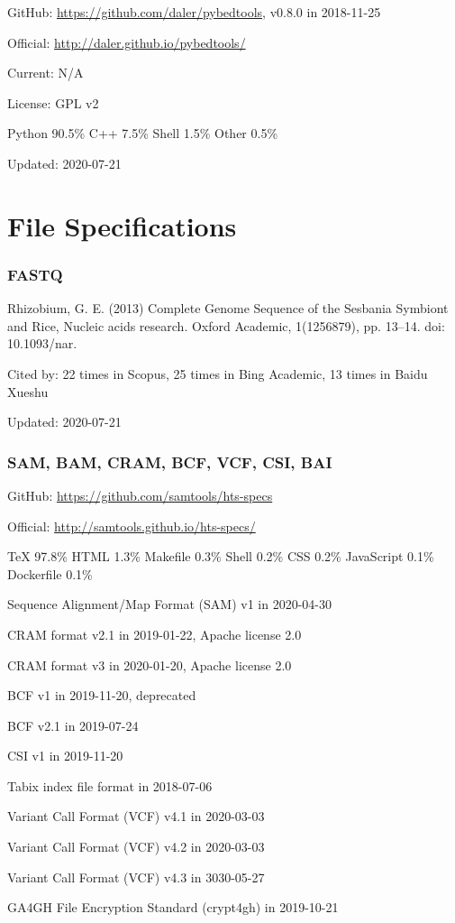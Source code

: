 \documentclass[]{article}
\newcommand{\cb}[3]{\par Cited by: {\color{blue}\Huge #1} times in Scopus, {\color{blue}\Huge #2} times in Bing Academic, {\color{blue}\Huge #3} times in Baidu Xueshu}
\begin{document}
GitHub: \url{https://github.com/daler/pybedtools}, v0.8.0 in 2018-11-25

Official: \url{http://daler.github.io/pybedtools/}

Current: N/A

License: GPL v2

Python 90.5\% C++ 7.5\% Shell 1.5\% Other 0.5\%

Updated: 2020-07-21

\part{File Specifications}
\section{FASTQ}

Rhizobium, G. E. (2013) Complete Genome Sequence of the Sesbania Symbiont and Rice, Nucleic acids research. Oxford Academic, 1(1256879), pp. 13–14. doi: 10.1093/nar.\cb{22}{25}{13}

Updated: 2020-07-21


\section{SAM, BAM, CRAM, BCF, VCF, CSI, BAI}

GitHub: \url{https://github.com/samtools/hts-specs}

Official: \url{http://samtools.github.io/hts-specs/}

TeX 97.8\% HTML 1.3\% Makefile 0.3\% Shell 0.2\% CSS 0.2\% JavaScript 0.1\% Dockerfile 0.1\% 

Sequence Alignment/Map Format (SAM) v1 in 2020-04-30

CRAM format v2.1 in 2019-01-22, Apache license 2.0

CRAM format v3 in 2020-01-20, Apache license 2.0

BCF v1 in 2019-11-20, deprecated

BCF v2.1 in 2019-07-24

CSI v1 in 2019-11-20

Tabix index file format in 2018-07-06

Variant Call Format (VCF) v4.1 in 2020-03-03

Variant Call Format (VCF) v4.2 in 2020-03-03

Variant Call Format (VCF) v4.3 in 3030-05-27

GA4GH File Encryption Standard (crypt4gh) in 2019-10-21
\end{document}
